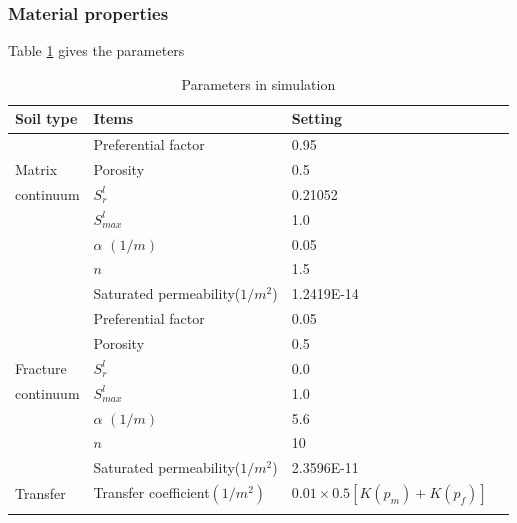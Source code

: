 \subsubsection*{Material properties}
Table \ref{us:Dual-line-setting2} gives the parameters
\begin{table}[H]
 \centering
 \caption{Parameters in simulation}
 \centering \label{us:Dual-line-setting2}
 \begin{tabular}{llll}
 \hline\hline\noalign{\smallskip}
 Soil type       & Items    & Setting  \\ \hline
                 &  Preferential factor   & 0.95   \\
Matrix           &  Porosity              & 0.5   \\
continuum        &  $S_r^l$               & 0.21052    \\
                 &  $S_{max}^l$           & 1.0      \\
                 &  $\alpha$ $(1/m)$      & 0.05       \\
                 &  $n$                   & 1.5    \\
                 &  Saturated permeability($1/m^2$) & 1.2419E-14  \\
\hline
                 &  Preferential factor   & 0.05    \\
                 &  Porosity           & 0.5      \\
Fracture         &  $S_r^l$            & 0.0    \\
continuum        &  $S_{max}^l$        & 1.0       \\
                 &  $\alpha$ $(1/m)$   & 5.6     \\
                 &  $n$                & 10    \\
                 &  Saturated permeability($1/m^2$) & 2.3596E-11\\
\hline
 Transfer    &  Transfer coefficient$(1/m^2)$  &  $0.01\times0.5[K(p_m)+K(p_f)]$ \\
 \noalign{\smallskip}\hline\hline
 \end{tabular}
\end{table}
